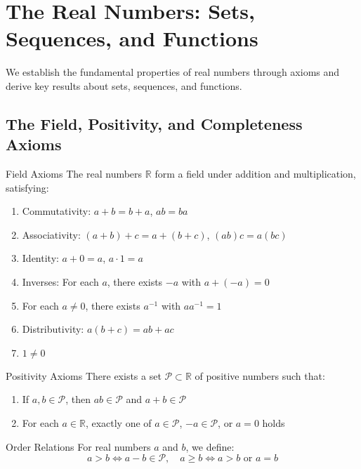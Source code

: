 \section{The Real Numbers: Sets, Sequences, and Functions}

\begin{note}
We establish the fundamental properties of real numbers through axioms and derive key results about sets, sequences, and functions.
\end{note}

\subsection{The Field, Positivity, and Completeness Axioms}

\begin{theorembox}{Field Axioms}
The real numbers $\mathbb{R}$ form a field under addition and multiplication, satisfying:
\begin{enumerate}[label=(\roman*)]
\item Commutativity: $a + b = b + a$, $ab = ba$
\item Associativity: $(a + b) + c = a + (b + c)$, $(ab)c = a(bc)$
\item Identity: $a + 0 = a$, $a \cdot 1 = a$
\item Inverses: For each $a$, there exists $-a$ with $a + (-a) = 0$
\item For each $a \neq 0$, there exists $a^{-1}$ with $aa^{-1} = 1$
\item Distributivity: $a(b + c) = ab + ac$
\item $1 \neq 0$
\end{enumerate}
\end{theorembox}

\begin{theorembox}{Positivity Axioms}
There exists a set $\mathcal{P} \subset \mathbb{R}$ of positive numbers such that:
\begin{enumerate}[label=(\roman*)]
\item If $a,b \in \mathcal{P}$, then $ab \in \mathcal{P}$ and $a + b \in \mathcal{P}$
\item For each $a \in \mathbb{R}$, exactly one of $a \in \mathcal{P}$, $-a \in \mathcal{P}$, or $a = 0$ holds
\end{enumerate}
\end{theorembox}

\begin{definitionbox}{Order Relations}
For real numbers $a$ and $b$, we define:
\[ a > b \iff a - b \in \mathcal{P}, \quad a \geq b \iff a > b \text{ or } a = b \]
\end{definitionbox}

